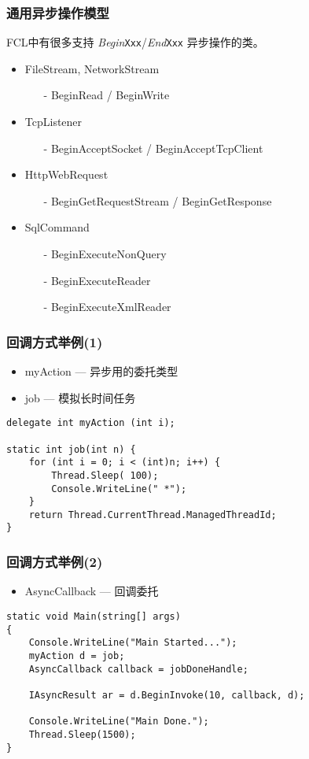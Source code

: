 \begin{frame}
\frametitle{通用异步操作模型}

FCL中有很多支持 \textit{Begin}\texttt{Xxx}/\textit{End}\texttt{Xxx} 异步操作的类。

\begin{itemize}
\setlength{\itemsep}{6pt plus 1pt}
\item FileStream, NetworkStream
\begin{itemize}
\item[-] BeginRead / BeginWrite
\end{itemize}
\item TcpListener
\begin{itemize}
\item[-] BeginAcceptSocket / BeginAcceptTcpClient
\end{itemize}
\item HttpWebRequest
\begin{itemize}
\item[-] BeginGetRequestStream / BeginGetResponse
\end{itemize}
\item SqlCommand
\begin{itemize}
\item[-] BeginExecuteNonQuery
\item[-] BeginExecuteReader
\item[-] BeginExecuteXmlReader
\end{itemize}
\end{itemize}
\end{frame}

\begin{frame}[fragile]
\frametitle{回调方式举例(1)}

\begin{itemize}
\item myAction --- 异步用的委托类型
\item job --- 模拟长时间任务
\end{itemize}
\begin{lstlisting}
delegate int myAction (int i);

static int job(int n) {
    for (int i = 0; i < (int)n; i++) {
        Thread.Sleep( 100);
        Console.WriteLine(" *");
    }
    return Thread.CurrentThread.ManagedThreadId;
}
\end{lstlisting}
\end{frame}

\begin{frame}[fragile]
\frametitle{回调方式举例(2)}
\begin{itemize}
\item AsyncCallback --- 回调委托
\end{itemize}
\begin{lstlisting}
static void Main(string[] args)
{
    Console.WriteLine("Main Started...");
    myAction d = job;
    AsyncCallback callback = jobDoneHandle;

    IAsyncResult ar = d.BeginInvoke(10, callback, d);

    Console.WriteLine("Main Done.");
    Thread.Sleep(1500);
}
\end{lstlisting}
\end{frame}

